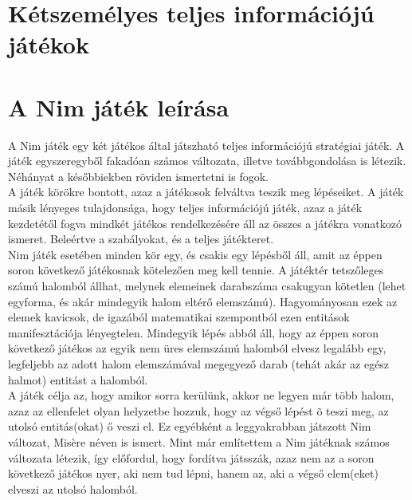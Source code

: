 \label{Chap:tema}

\section{Kétszemélyes teljes információjú játékok}


\section{A Nim játék leírása}
A Nim játék egy két játékos által játszható teljes információjú stratégiai játék. A játék egyszeregyből fakadóan számos változata, illetve továbbgondolása is létezik. Néhányat a későbbiekben röviden ismertetni is fogok. \\

A játék körökre bontott, azaz a játékosok felváltva teszik meg lépéseiket. A játék másik lényeges tulajdonsága, hogy teljes információjú játék, azaz a játék kezdetétől fogva mindkét játékos rendelkezésére áll az összes a játékra vonatkozó ismeret. Beleértve a szabályokat, és a teljes játékteret.\\

Nim játék esetében minden kör egy, és csakis egy lépésből áll, amit az éppen soron következő játékosnak kötelezően meg kell tennie. A játéktér tetszőleges számú halomból állhat, melynek elemeinek darabszáma csakugyan kötetlen (lehet egyforma, és akár mindegyik halom eltérő elemszámú). Hagyományosan ezek az elemek kavicsok, de igazából matematikai szempontból ezen entitások manifesztációja lényegtelen. Mindegyik lépés abból áll, hogy az éppen soron következő játékos az egyik nem üres elemszámú halomból elvesz legalább egy, legfeljebb az adott halom elemszámával megegyező darab (tehát akár az egész halmot) entitást a halomból.\\

A játék célja az, hogy amikor sorra kerülünk, akkor ne legyen már több halom, azaz az ellenfelet olyan helyzetbe hozzuk, hogy az végső lépést õ teszi meg, az utolsó entitás(okat) ő veszi el. Ez egyébként a leggyakrabban játszott Nim változat, Misère néven is ismert. Mint már említettem a Nim játéknak számos változata létezik, így előfordul, hogy fordítva játsszák, azaz nem az a soron következő játékos nyer, aki nem tud lépni, hanem az, aki a végső elem(eket) elveszi az utolsó halomból.\\


